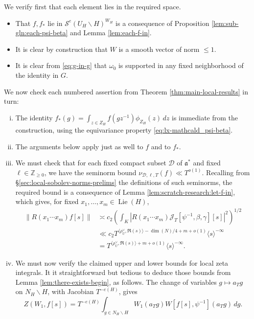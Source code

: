 \documentclass[reqno]{amsart}
\DeclareMathOperator{\Lie}{Lie}
\theoremstyle{plain} \newtheorem{theorem} {Theorem}
\theoremstyle{definition} \newtheorem{definition} [theorem] {Definition}
\theoremstyle{itplain} %
\numberwithin{equation}{section}
\numberwithin{theorem}{section}
\renewcommand{\geq}{\geqslant}
\renewcommand{\leq}{\leqslant}
\begin{document}
We verify first that each element lies in the required space.
\begin{itemize}
\item That $f, f_{\ast}$ lie in $\mathcal{S}^e(U_H \backslash H)^{W_H}$ is a consequence of Proposition \ref{lem:sub-gln:each-psi-beta} and Lemma \ref{lem:each-f-in}.
\item It is clear by construction that $W$ is a smooth vector of norm $\leq 1$.
\item It is clear from \eqref{eq:g-in-g} that $\omega_0$ is supported in any fixed neighborhood of the identity in $G$.
\end{itemize}
We now check each numbered assertion from Theorem \ref{thm:main-local-results} in turn:
\begin{enumerate}[(i)]
\item The identity $f_{\ast}(g) = \int _{z \in Z_H} f(g z^{-1}) \phi_{Z_H}(z) \, d z$ is immediate from the construction, using the equivariance property \eqref{eq:lx-mathcald_psi-beta}.
\item The arguments below apply just as well to $f$ and to $f_{\ast}$.
\item We must check that for each fixed compact subset $\mathcal{D}$ of $\mathfrak{a}^*$ and fixed $\ell \in \mathbb{Z}_{\geq 0}$, we have the seminorm bound $\nu_{\mathcal{D},\ell,T}(f) \ll T^{o(1)}$.  Recalling from \S\ref{sec:local-sobolev-norms-prelims} the definitions of such seminorms, the required bound is a consequence of Lemma \ref{lem:scratch-research:let-f-in}, which gives, for fixed $x_1,\dotsc,x_m \in \Lie(H)$,
\begin{align*}
  \|R(x_1 \dotsb x_m) f[s]\|
  &\asymp c_2 \left(\int_K \left\lvert R(x_1 \dotsb x_m) \mathcal{J}_T[\psi^{-1},\beta,\gamma][s] \right\rvert^2\right)^{1/2} \\
  &\ll c_2 T ^{\langle \rho_U^\vee, \Re(s) \rangle - \dim(N)/4 + m +  o(1)} \langle s \rangle^{-\infty} \\
  &= T ^{\langle \rho_U^\vee, \Re(s) \rangle + m + o(1)} \langle s \rangle^{-\infty}.
\end{align*}
\item We must now verify the claimed upper and lower bounds for local zeta integrals.  It it straightforward but tedious to deduce those bounds from Lemma \ref{lem:there-exists-begin}, as follows.  The change of variables $g \mapsto a_T g$ on $N_H \backslash H$, with Jacobian $T^{-e(H)}$, gives
\begin{equation*}
  Z(W_1, f[s]) = T^{-e(H)} \int _{g \in N_H \backslash H} W_1(a_T g) W[f[s], \psi^{-1}](a_T g) \, d g.

\end{equation*}
\end{enumerate}
\end{document}
